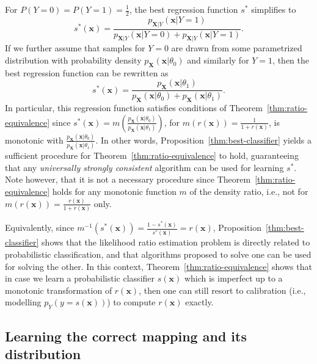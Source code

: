 \documentclass[12pt]{article}
\numberwithin{equation}{section}
\theoremstyle{plain}
\begin{document}
For $P(Y=0)=P(Y=1)=\frac{1}{2}$, the best regression function $s^*$ simplifies
to
\begin{equation}
s^*(\mathbf{x}) = \frac{p_{\mathbf{X}|Y}(\mathbf{x}|Y=1)}{p_{\mathbf{X}|Y}(\mathbf{x} | Y=0) + p_{\mathbf{X}|Y}(\mathbf{x} | Y=1)}.
\end{equation}
If we further assume that samples for $Y=0$ are drawn from some parametrized
distribution with probability density $p_{\mathbf{X}}(\mathbf{x}|\theta_0)$
and similarly for $Y=1$, then the best regression function can be rewritten
as
\begin{equation}
s^*(\mathbf{x}) = \frac{p_{\mathbf{X}}(\mathbf{x}|\theta_1)}{p_{\mathbf{X}}(\mathbf{x} | \theta_0) + p_{\mathbf{X}}(\mathbf{x} | \theta_1)}.
\end{equation}
In particular, this regression function satisfies conditions of
Theorem~\ref{thm:ratio-equivalence} since $s^*(\mathbf{x}) =
m(\frac{p_\mathbf{X}(\mathbf{x}|\theta_0)}{p_\mathbf{X}(\mathbf{x}|\theta_1)})$,
for $m(r(\mathbf{x})) = \frac{1}{1 + r(\mathbf{x})}$, is monotonic with
$\frac{p_\mathbf{X}(\mathbf{x}|\theta_0)}{p_\mathbf{X}(\mathbf{x}|\theta_1)}$.
In other words, Proposition~\ref{thm:best-classifier} yields a sufficient
procedure for Theorem~\ref{thm:ratio-equivalence} to hold, guaranteeing that any
{\it universally strongly consistent} algorithm can be used for learning $s^*$.
Note however, that it is not a necessary procedure since
Theorem~\ref{thm:ratio-equivalence} holds for any monotonic function $m$ of the
density ratio, i.e., not for $m(r(\mathbf{x})) = \frac{r(\mathbf{x})}{1 +
r(\mathbf{x})}$ only.

Equivalently, since $m^{-1}(s^*(\mathbf{x})) = \frac{1 -
s^*(\mathbf{x})}{s^*(\mathbf{x})} = r(\mathbf{x})$,
Proposition~\ref{thm:best-classifier} shows that the likelihood ratio estimation
problem is directly related to probabilistic classification, and that algorithms
proposed to solve one can be used for solving the other. In this context,
Theorem~\ref{thm:ratio-equivalence} shows that in case we learn a probabilistic
classifier $s(\mathbf{x})$ which is imperfect up to a monotonic transformation
of $r(\mathbf{x})$, then one can still resort to calibration (i.e., modelling
$p_Y(y=s(\mathbf{x}))$) to compute $r(\mathbf{x})$ exactly.

\subsection{Learning the correct mapping and its distribution}
\end{document}
